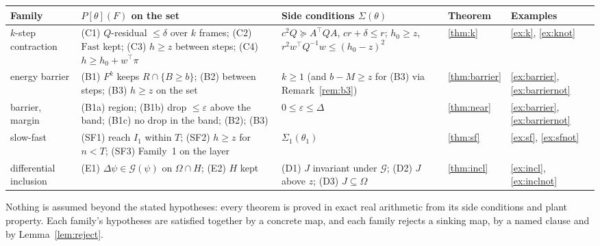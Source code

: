 \documentclass[11pt]{article}
\theoremstyle{definition}
\newcommand{\Fast}{\ensuremath{\mathrm{Fast}}}
\newcommand{\G}{\mathcal{G}}
\begin{document}
\begin{center}
\small
\begin{tabular}{p{2.1cm}p{4.3cm}p{3.8cm}p{1.6cm}p{2cm}}
\toprule
Family & $P[\theta](F)$ on the set & Side conditions $\Sigma(\theta)$ & Theorem & Examples\\
\midrule
$k$-step contraction & (C1) $Q$-residual $\le \delta$ over $k$ frames; (C2) $\Fast$ kept; (C3) $h \ge z$ between steps; (C4) $h \ge h_0 + w^\top\pi$ & $c^2Q \succeq A^\top Q A$, $c r + \delta \le r$; $h_0 \ge z$, $r^2 w^\top Q^{-1} w \le (h_0 - z)^2$ & \ref{thm:k} & \ref{ex:k}, \ref{ex:knot}\\
energy barrier & (B1) $F^k$ keeps $R \cap \{B \ge b\}$; (B2) between steps; (B3) $h \ge z$ on the set & $k \ge 1$ (and $b - M \ge z$ for (B3) via Remark~\ref{rem:b3}) & \ref{thm:barrier} & \ref{ex:barrier}, \ref{ex:barriernot}\\
barrier, margin & (B1a) region; (B1b) drop $\le \varepsilon$ above the band; (B1c) no drop in the band; (B2); (B3) & $0 \le \varepsilon \le \Delta$ & \ref{thm:near} & \ref{ex:barrier}, \ref{ex:barriernot}\\
slow-fast & (SF1) reach $I_1$ within $T$; (SF2) $h \ge z$ for $n < T$; (SF3) Family~1 on the layer & $\Sigma_1(\theta_1)$ & \ref{thm:sf} & \ref{ex:sf}, \ref{ex:sfnot}\\
differential inclusion & (E1) $\Delta\psi \in \G(\psi)$ on $\Omega \cap H$; (E2) $H$ kept & (D1) $J$ invariant under $\G$; (D2) $J$ above $z$; (D3) $J \subseteq \Omega$ & \ref{thm:incl} & \ref{ex:incl}, \ref{ex:inclnot}\\
\bottomrule
\end{tabular}
\end{center}

Nothing is assumed beyond the stated hypotheses: every theorem is proved in exact real arithmetic from its side conditions and plant property. Each family's hypotheses are satisfied together by a concrete map, and each family rejects a sinking map, by a named clause and by Lemma~\ref{lem:reject}.
\end{document}
